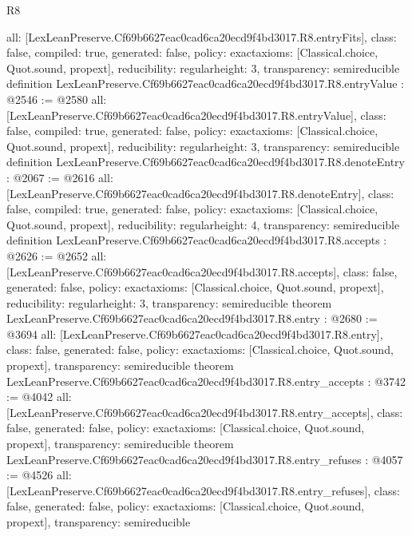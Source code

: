 \begin{lexlean}{R8}
\begin{coremodule}
{  all: [LexLeanPreserve.Cf69b6627eac0cad6ca20ecd9f4bd3017.R8.entryFits],
  class: false,
  compiled: true,
  generated: false,
  policy: exact{axioms: [Classical.choice, Quot.sound, propext]},
  reducibility: regular{height: 3},
  transparency: semireducible
}
definition LexLeanPreserve.Cf69b6627eac0cad6ca20ecd9f4bd3017.R8.entryValue : @2546 := @2580 {
  all: [LexLeanPreserve.Cf69b6627eac0cad6ca20ecd9f4bd3017.R8.entryValue],
  class: false,
  compiled: true,
  generated: false,
  policy: exact{axioms: [Classical.choice, Quot.sound, propext]},
  reducibility: regular{height: 3},
  transparency: semireducible
}
definition LexLeanPreserve.Cf69b6627eac0cad6ca20ecd9f4bd3017.R8.denoteEntry : @2067 := @2616 {
  all: [LexLeanPreserve.Cf69b6627eac0cad6ca20ecd9f4bd3017.R8.denoteEntry],
  class: false,
  compiled: true,
  generated: false,
  policy: exact{axioms: [Classical.choice, Quot.sound, propext]},
  reducibility: regular{height: 4},
  transparency: semireducible
}
definition LexLeanPreserve.Cf69b6627eac0cad6ca20ecd9f4bd3017.R8.accepts : @2626 := @2652 {
  all: [LexLeanPreserve.Cf69b6627eac0cad6ca20ecd9f4bd3017.R8.accepts],
  class: false,
  generated: false,
  policy: exact{axioms: [Classical.choice, Quot.sound, propext]},
  reducibility: regular{height: 3},
  transparency: semireducible
}
theorem LexLeanPreserve.Cf69b6627eac0cad6ca20ecd9f4bd3017.R8.entry : @2680 := @3694 {
  all: [LexLeanPreserve.Cf69b6627eac0cad6ca20ecd9f4bd3017.R8.entry],
  class: false,
  generated: false,
  policy: exact{axioms: [Classical.choice, Quot.sound, propext]},
  transparency: semireducible
}
theorem LexLeanPreserve.Cf69b6627eac0cad6ca20ecd9f4bd3017.R8.entry_accepts : @3742 := @4042 {
  all: [LexLeanPreserve.Cf69b6627eac0cad6ca20ecd9f4bd3017.R8.entry_accepts],
  class: false,
  generated: false,
  policy: exact{axioms: [Classical.choice, Quot.sound, propext]},
  transparency: semireducible
}
theorem LexLeanPreserve.Cf69b6627eac0cad6ca20ecd9f4bd3017.R8.entry_refuses : @4057 := @4526 {
  all: [LexLeanPreserve.Cf69b6627eac0cad6ca20ecd9f4bd3017.R8.entry_refuses],
  class: false,
  generated: false,
  policy: exact{axioms: [Classical.choice, Quot.sound, propext]},
  transparency: semireducible
}


\end{coremodule}
\end{lexlean}
